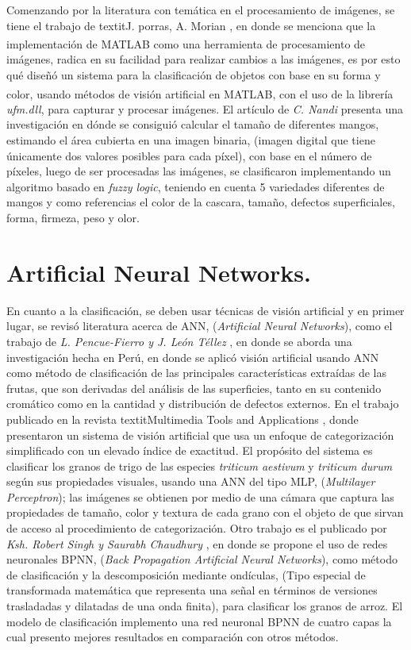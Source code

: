 	Comenzando por la literatura con temática en el procesamiento de imágenes, se tiene el trabajo de textit{J. porras, A. Morian} \cite{article3}, en donde se menciona que la implementación de MATLAB\textsuperscript{\textregistered} como una herramienta de procesamiento de imágenes, radica en su facilidad para realizar cambios a las imágenes, es por esto qué diseñó un sistema para la clasificación de objetos con base en su forma y color, usando métodos de visión artificial en MATLAB\textsuperscript{\textregistered}, con el uso de la librería \textit{ufm.dll}, para capturar y procesar imágenes. El artículo de \textit{C. Nandi} \cite{inproceedings} presenta una investigación en dónde se consiguió calcular el tamaño de diferentes mangos, estimando el área cubierta en una imagen binaria, (imagen digital que tiene únicamente dos valores posibles para cada píxel), con base en el número de píxeles, luego de ser procesadas las imágenes, se clasificaron implementando un algoritmo basado en \textit{fuzzy logic}, teniendo en cuenta 5 variedades diferentes de mangos y como referencias el color de la cascara, tamaño, defectos superficiales, forma, firmeza, peso y olor.\\

\section{Artificial Neural Networks.}
	En cuanto a la clasificación, se deben usar técnicas de visión artificial y en primer lugar, se revisó literatura  acerca de ANN, (\textit{Artificial Neural Networks}), como el trabajo de \textit{L. Pencue-Fierro y J. León Téllez} \cite{article2}, en donde se aborda una investigación hecha en Perú, en donde se aplicó visión artificial usando ANN como método de clasificación de las principales características extraídas de las frutas, que son derivadas del análisis de las superficies, tanto en su contenido cromático como en la cantidad y distribución de defectos externos. En el trabajo publicado en la revista textit{Multimedia Tools and Applications} \cite{Shrivastava2017}, donde presentaron un sistema de visión artificial que usa un enfoque de categorización simplificado con un elevado índice de exactitud. El propósito del sistema es clasificar los granos de trigo de las especies \textit{triticum aestivum} y \textit{triticum durum} según sus propiedades visuales, usando una ANN del tipo MLP, (\textit{Multilayer Perceptron}); las imágenes se obtienen por medio de una cámara que captura las propiedades de tamaño, color y textura de cada grano con el objeto de que sirvan de acceso al procedimiento de categorización. Otro trabajo es el publicado por \textit{Ksh. Robert Singh y Saurabh Chaudhury} \cite{Singh2016}, en donde se propone el uso de redes neuronales BPNN, (\textit{Back Propagation Artificial Neural Networks}), como método de clasificación y la descomposición mediante ondículas, (Tipo especial de transformada matemática que representa una señal en términos de versiones trasladadas y dilatadas de una onda finita), para clasificar los granos de arroz. El modelo de clasificación implemento una red neuronal BPNN de cuatro capas la cual presento mejores resultados en comparación con otros métodos.\\
	
